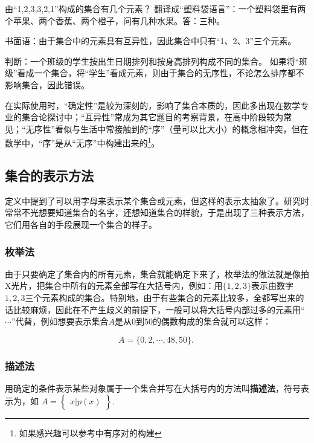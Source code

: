 \begin{example}{由“1,2,3,3,2,1”构成的集合有几个元素？}
翻译成“塑料袋语言”：一个塑料袋里有两个苹果、两个香蕉、两个橙子，问有几种水果。答：三种。

书面语：由于集合中的元素具有互异性，因此集合中只有“1、2、3”三个元素。
\end{example}

\begin{example}{判断：一个班级的学生按出生日期排列和按身高排列构成不同的集合。}
如果将“班级”看成一个集合，将“学生”看成元素，则由于集合的无序性，不论怎么排序都不影响集合，因此错误。
\end{example}

在实际使用时，“确定性”是较为深刻的，影响了集合本质的，因此多出现在数学专业的集合论探讨中；“互异性”常成为其它题目的考察背景，在高中阶段较为常见；“无序性”看似与生活中常接触到的“序”（量可以比大小）的概念相冲突，但在数学中，“序”是从“无序”中构建出来的\footnote{如果感兴趣可以参考中有序对的构建}。

\subsection{集合的表示方法}

定义中提到了可以用字母来表示某个集合或元素，但这样的表示太抽象了。研究时常常不光想要知道集合的名字，还想知道集合的样貌，于是出现了三种表示方法，它们用各自的手段展现一个集合的样子。

\subsubsection{枚举法}

由于只要确定了集合内的所有元素，集合就能确定下来了，枚举法的做法就是像拍X光片，把集合中所有的元素全部写在大括号内，例如：用$\{1,2,3\}$表示由数字$1,2,3$三个元素构成的集合。特别地，由于有些集合的元素比较多，全都写出来的话比较麻烦，因此在不产生歧义的前提下，一般可以将大括号内部过多的元素用“$\cdots$”代替，例如想要表示集合$A$是从$0$到$50$的偶数构成的集合就可以这样：

\begin{equation}
A=\{0,2, \cdots ,48,50\}.~
\end{equation}


\subsubsection{描述法}

用确定的条件表示某些对象属于一个集合并写在大括号内的方法叫\textbf{描述法}，符号表示为，如 $A=\begin{Bmatrix} x|p(x) \end{Bmatrix}$.

